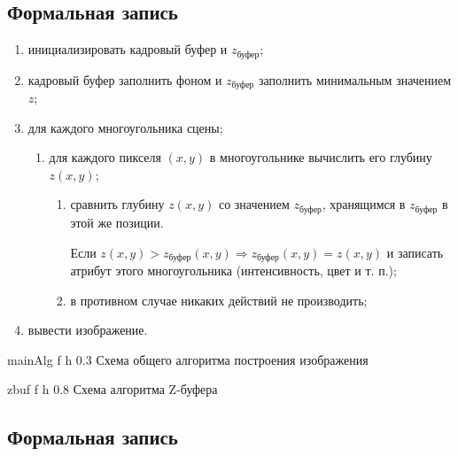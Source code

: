\subsection{Формальная запись}
\begin{enumerate}
	\item инициализировать кадровый буфер и $z_{\text{буфер}}$;
	\item кадровый буфер заполнить фоном и $z_{\text{буфер}}$ заполнить  минимальным значением $z$;
	\item для каждого многоугольника сцены;
	\begin{enumerate}[label=\arabic{enumi}.\arabic*]
		\item  для каждого пикселя $(x, y)$ в многоугольнике вычислить его глубину $z(x, y)$;
		\begin{enumerate}
			\item  сравнить глубину $z(x, y)$ со значением  $z_{\text{буфер}}$, хранящимся в $z_{\text{буфер}}$ в этой же позиции. 
			
			Если  $z(x, y) > z_{\text{буфер}}(x, y) \Rightarrow z_{\text{буфер}}(x, y) = z(x, y) $ и записать атрибут этого многоугольника (интенсивность, цвет и т. п.);
			
			\item в противном случае никаких действий не производить;
		\end{enumerate}
	\end{enumerate}
	
	\item вывести изображение.
\end{enumerate}

\clearpage

\fi 

{mainAlg} %
{f} %
{h} %
{0.3\textwidth} %
{Схема общего алгоритма построения изображения} %

	{zbuf} %
	{f} %
	{h} %
	{0.8\textwidth} %
	{Схема алгоритма Z-буфера} %
\clearpage


\subsection{Формальная запись}

